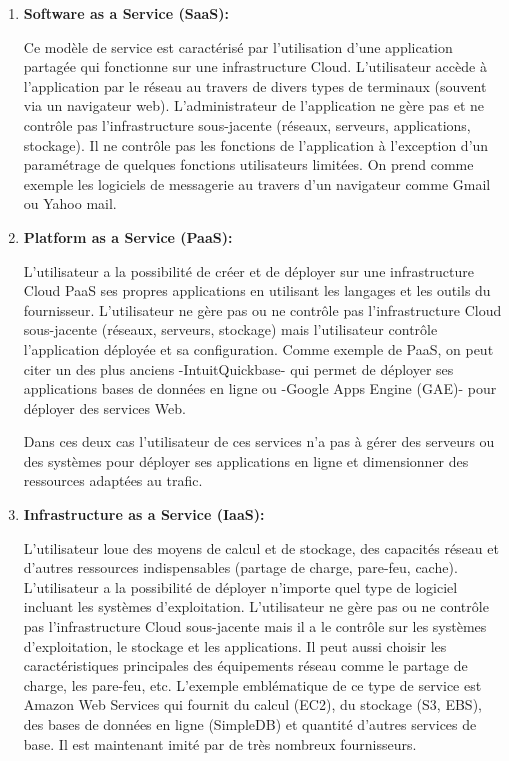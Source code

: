 \begin{enumerate}
\item 	\textbf{Software as a Service (SaaS):}

Ce modèle de service est caractérisé par l’utilisation d’une application partagée qui fonctionne sur une infrastructure Cloud. L’utilisateur accède à l’application par le réseau au travers de divers types de terminaux (souvent via un navigateur web). L’administrateur de l’application ne gère pas et ne contrôle pas l’infrastructure sous-jacente (réseaux, serveurs, applications, stockage).  Il ne contrôle pas les fonctions de l’application à l’exception d’un paramétrage de quelques fonctions utilisateurs limitées. On prend comme exemple les logiciels de messagerie au travers d’un navigateur comme Gmail ou Yahoo mail. 

\item  \textbf{ Platform as a Service (PaaS):}

L’utilisateur a la possibilité de créer et de déployer sur une infrastructure Cloud PaaS ses propres applications en utilisant les langages et les outils du fournisseur. L’utilisateur ne gère pas ou ne contrôle pas l’infrastructure Cloud sous-jacente (réseaux, serveurs, stockage) mais l’utilisateur contrôle l’application déployée et sa configuration. Comme exemple de PaaS, on peut citer un des plus anciens -IntuitQuickbase- qui permet de déployer ses applications bases de données en ligne ou -Google Apps Engine (GAE)- pour déployer des services Web. 

Dans ces deux cas l’utilisateur de ces services n’a pas à gérer des serveurs ou des systèmes pour déployer ses applications en ligne et dimensionner des ressources adaptées au trafic.
\item   \textbf{Infrastructure as a Service (IaaS):}

L’utilisateur loue des moyens de calcul et de stockage, des capacités réseau et d’autres ressources indispensables (partage de charge, pare-feu, cache). L’utilisateur a la possibilité de déployer n’importe quel type de logiciel incluant les systèmes d’exploitation. L’utilisateur ne gère pas ou ne contrôle pas l’infrastructure Cloud sous-jacente mais il a le contrôle sur les systèmes d’exploitation, le stockage et les applications. Il peut aussi choisir les caractéristiques principales des équipements réseau comme le partage de charge, les pare-feu, etc. L’exemple emblématique de ce type de service est Amazon Web Services qui fournit du calcul (EC2), du stockage (S3, EBS), des bases de données en ligne (SimpleDB) et quantité d’autres services de base. Il est maintenant imité par de très nombreux fournisseurs.
	  
\end{enumerate}
